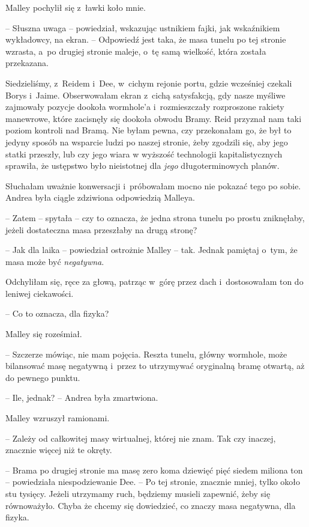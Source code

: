 \documentclass[oneside,polish,11pt,sfheadings]{mwbk}
\begin{document}
Malley pochylił się z~ławki koło mnie. 

-- Słuszna uwaga -- powiedział,
wskazując ustnikiem fajki, jak wskaźnikiem wykładowcy, na ekran. -- Odpowiedź jest taka, że masa tunelu po tej stronie wzrasta, a~po drugiej
stronie maleje, o~tę samą wielkość, która została przekazana.

Siedzieliśmy, z~Reidem i~Dee, w~cichym rejonie portu, gdzie wcześniej
czekali Borys i~Jaime. Obserwowałam ekran z~cichą satysfakcją, gdy nasze
myśliwe zajmowały pozycje dookoła wormhole'a i~rozmieszczały rozproszone
rakiety manewrowe, które zacisnęły się dookoła obwodu Bramy. Reid
przyznał nam taki poziom kontroli nad Bramą. Nie byłam pewna, czy
przekonałam go, że był to jedyny sposób na wsparcie ludzi po naszej
stronie, żeby zgodzili się, aby jego statki przeszły, lub czy jego wiara
w wyższość technologii kapitalistycznych sprawiła, że ustępstwo było
nieistotnej dla \textit{jego} długoterminowych planów.

Słuchałam uważnie konwersacji i~próbowałam mocno nie pokazać tego po
sobie. Andrea była ciągle zdziwiona odpowiedzią Malleya.

-- Zatem -- spytała -- czy to oznacza, że jedna strona tunelu po prostu
zniknęłaby, jeżeli dostateczna masa przeszłaby na drugą stronę?

-- Jak dla laika -- powiedział ostrożnie Malley -- tak. Jednak pamiętaj o~tym, że masa może być \textit{negatywna}.

Odchyliłam się, ręce za głową, patrząc w~górę przez dach i~dostosowałam
ton do leniwej ciekawości.

-- Co to oznacza, dla fizyka?

Malley się roześmiał. 

-- Szczerze mówiąc, nie mam pojęcia. Reszta tunelu,
główny wormhole, może bilansować masę negatywną i~przez to utrzymywać
oryginalną bramę otwartą, aż do pewnego punktu.

-- Ile, jednak? -- Andrea była zmartwiona.

Malley wzruszył ramionami. 

-- Zależy od całkowitej masy wirtualnej,
której nie znam. Tak czy inaczej, znacznie więcej niż te okręty.

-- Brama po drugiej stronie ma masę zero koma dziewięć pięć siedem
miliona ton -- powiedziała niespodziewanie Dee. -- Po tej stronie,
znacznie mniej, tylko około stu tysięcy. Jeżeli utrzymamy ruch, będziemy
musieli zapewnić, żeby się równoważyło. Chyba że chcemy się dowiedzieć,
co znaczy masa negatywna, dla fizyka.
\end{document}
